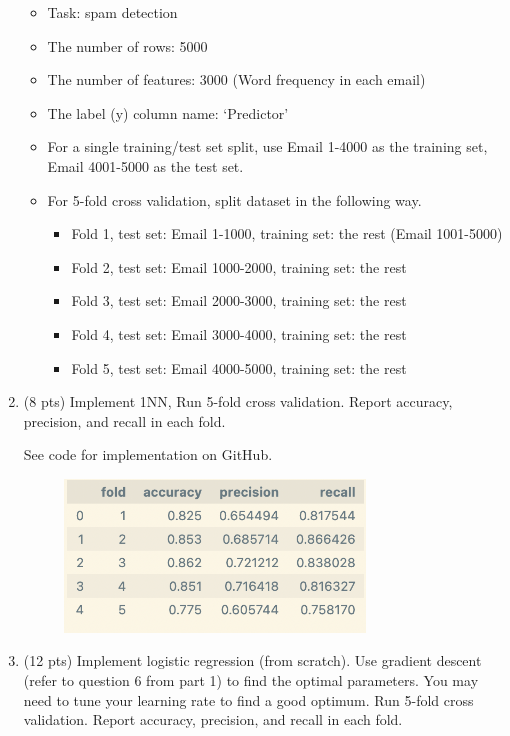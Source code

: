 \documentclass[a4paper]{article}
\theoremstyle{definition}
\newenvironment{soln}{
    \leavevmode\color{blue}\ignorespaces
}{}
\begin{document}
\begin{enumerate}
	\begin{itemize}
		\item Task: spam detection
		\item The number of rows: 5000
		\item The number of features: 3000 (Word frequency in each email)
		\item The label (y) column name: `Predictor'
		\item For a single training/test set split, use Email 1-4000 as the training set, Email 4001-5000 as the test set.
		\item For 5-fold cross validation, split dataset in the following way.
		\begin{itemize}
			\item Fold 1, test set: Email 1-1000, training set: the rest (Email 1001-5000)
			\item Fold 2, test set: Email 1000-2000, training set: the rest
			\item Fold 3, test set: Email 2000-3000, training set: the rest
			\item Fold 4, test set: Email 3000-4000, training set: the rest
			\item Fold 5, test set: Email 4000-5000, training set: the rest			
		\end{itemize}
	\end{itemize}
	
	\item (8 pts) Implement 1NN, Run 5-fold cross validation. Report accuracy, precision, and recall in each fold.
	
	\begin{soln}
		See code for implementation on GitHub.
	
		\begin{figure}[h]
			\centering
			\includegraphics[width=8cm]{figures/Q2_2.png}
		\end{figure}
	\end{soln}

	\medskip
	
	\item (12 pts) Implement logistic regression (from scratch). Use gradient descent (refer to question 6 from part 1) to find the optimal parameters. You may need to tune your learning rate to find a good optimum. Run 5-fold cross validation. Report accuracy, precision, and recall in each fold.
	

\end{enumerate}
\end{document}
